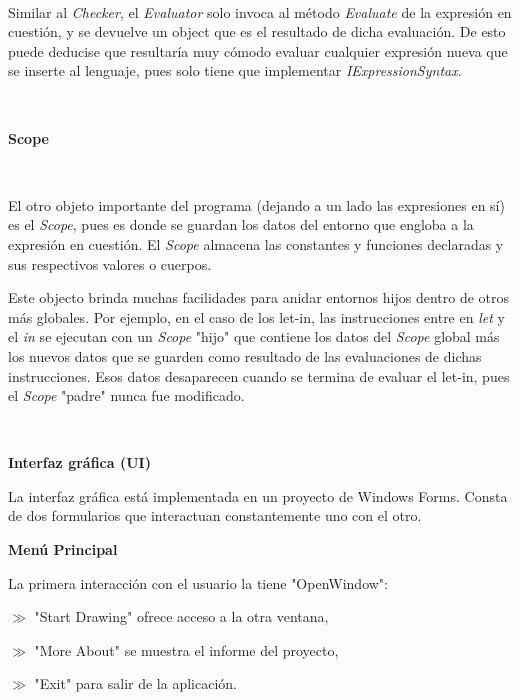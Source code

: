\documentclass{article}
\begin{document}
\ 


Similar al \textit{Checker}, el \textit{Evaluator} solo invoca al método \textit{Evaluate} de la expresión en cuestión, y se
devuelve un object que es el resultado de dicha evaluación. De esto puede deducise que resultaría muy cómodo evaluar cualquier
expresión nueva que se inserte al lenguaje, pues solo tiene que implementar \textit{IExpressionSyntax}. 


\ 


\begin{center}
	\large\textbf{Scope}
\end{center}


\


El otro objeto importante del programa (dejando a un lado las expresiones en sí) es el \textit{Scope}, pues es donde se guardan
los datos del entorno que engloba a la expresión en cuestión. El \textit{Scope} almacena las constantes y funciones declaradas
y sus respectivos valores o cuerpos. 

Este objecto brinda muchas facilidades para anidar entornos hijos dentro de otros más globales. Por ejemplo, en el caso de los
let-in, las instrucciones entre en \textit{let} y el \textit{in} se ejecutan con un \textit{Scope} "hijo" que contiene los datos
del \textit{Scope} global más los nuevos datos que se guarden como resultado de las evaluaciones de dichas instrucciones. Esos 
datos desaparecen cuando se termina de evaluar el let-in, pues el \textit{Scope} "padre" nunca fue modificado.


\


\newpage

\begin{center}
	\textbf{{\Huge {Interfaz gráfica (UI)}}}
\end{center}

La interfaz gráfica está implementada en un proyecto de Windows Forms. Consta de dos formularios que interactuan constantemente uno
con el otro. 

\begin{center}
	\large\textbf{Menú Principal}
\end{center}

La primera interacción con el usuario la tiene "OpenWindow": 


$\gg$ "Start Drawing" ofrece acceso a la otra ventana, 


$\gg$ "More About" se muestra el informe del proyecto, 


$\gg$ "Exit" para salir de la aplicación.
\end{document}
